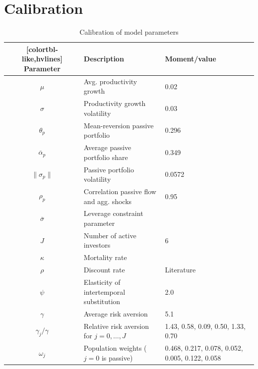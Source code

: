 \documentclass[12pt,english]{article}
\date{}
\begin{document}
\onehalfspacing	

\section*{Calibration}

\begin{table}[h!]
    \centering 
    \caption{Calibration of model parameters}
    \label{tab:calibration}
    \begin{NiceTabular}{cll}[colortbl-like,hvlines]
\toprule
{}
\textbf{Parameter} &  \textbf{Description} &  \textbf{Moment/value} \\ 
\midrule
$\mu$ &  Avg. productivity growth & 0.02 \\ 
$\sigma$ & Productivity growth volatility & 0.03 \\ 
$\theta_p$ & Mean-reversion passive portfolio & 0.296 \\ 
$\overline{\alpha}_p$ & Average passive portfolio share & 0.349 \\ 
$\|\sigma_p\|$ & Passive portfolio volatility & 0.0572 \\ 
$\rho_p$ & Correlation passive flow and agg. shocks & 0.95 \\ 
$\overline{\sigma}$ & Leverage constraint parameter &  \\ 
$J$ & Number of active investors & 6 \\ 
$\kappa$ & Mortality rate & \\
$\rho$ & Discount rate &  Literature \\ 
$\psi$ & Elasticity of intertemporal substitution & 2.0 \\ 
$\gamma$ & Average risk aversion & 5.1 \\ 
$\gamma_j/\gamma$ & Relative risk aversion for $j = 0,\ldots, J$& 1.43, 0.58, 0.09, 0.50, 1.33, 0.70 \\ 
$\omega_j$ & Population weights ($j=0$ is passive) & 
0.468, 0.217, 0.078, 0.052, 0.005, 0.122, 0.058
\\ 
\bottomrule
\end{NiceTabular}
\end{table}
\end{document}
